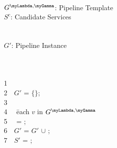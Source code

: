 \newenvironment{redtext}{\footnotesize	\color{gray}}{~~}
\newenvironment{ourcolor}{\color{OurColor}}{~~}

  \begin{ourcolor}
  \begin{tabbing}
      \INPUT\\
      $G^{\myLambda,\myGamma}$: Pipeline Template\\
      $S^c$: Candidate Services\\
      ~\\[1pt]
      \OUTPUT\\
      $G'$: Pipeline Instance\\
      ~\\[1pt]
      \\
      \\
      \begin{redtext}1\end{redtext}\\
      \begin{redtext}2\end{redtext}$G'$ = $\{\}$;\\
      \begin{redtext}3\end{redtext}\\
      \begin{redtext}4\end{redtext} \= each $v$ in $G^{\myLambda,\myGamma}$\\
      \begin{redtext}5\end{redtext}\tabone \vii{} = ;\\
      \begin{redtext}6\end{redtext}\tabone $G'$ = $G'$ $\cup$ \vii;\\
      \begin{redtext}7\end{redtext}\tabone $S'$ = ;\\

\end{tabbing}
\end{ourcolor}
